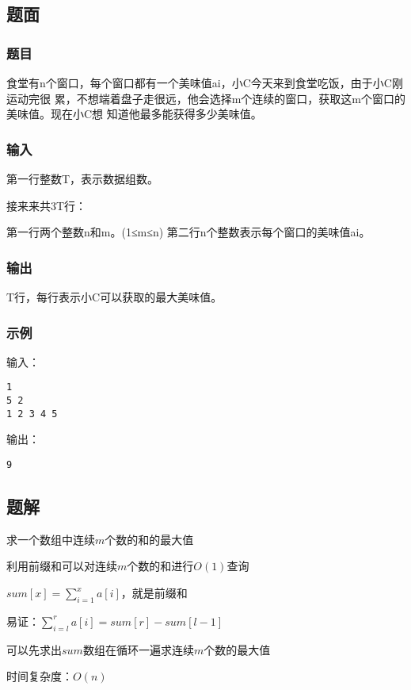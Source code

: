 \subsection{题面}

\subsubsection{题目}
食堂有n个窗口，每个窗口都有一个美味值ai，小C今天来到食堂吃饭，由于小C刚运动完很
累，不想端着盘子走很远，他会选择m个连续的窗口，获取这m个窗口的美味值。现在小C想
知道他最多能获得多少美味值。

\subsubsection{输入}
第一行整数T，表示数据组数。

接来来共3T行：

第一行两个整数n和m。(1≤m≤n)
第二行n个整数表示每个窗口的美味值ai。

\subsubsection{输出}
T行，每行表示小C可以获取的最大美味值。

\subsubsection{示例}
输入：
\begin{lstlisting}
1
5 2
1 2 3 4 5
\end{lstlisting}

输出：
\begin{lstlisting}
9
\end{lstlisting}

\subsection{题解}
求一个数组中连续$m$个数的和的最大值

利用前缀和可以对连续$m$个数的和进行$O(1)$查询

$sum[x] = \sum\limits_{i = 1}^{x}{a[i]}$，就是前缀和

易证：$\sum_{i = l}^{r}{a[i]} = sum[r] - sum[l - 1]$

可以先求出$sum$数组在循环一遍求连续$m$个数的最大值

时间复杂度：$O(n)$
